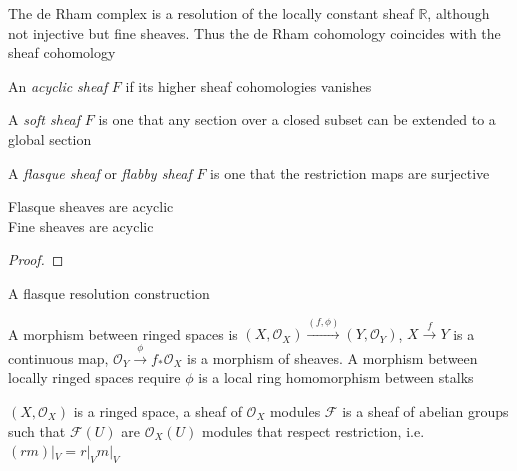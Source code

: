 \documentclass[main]{subfiles}
\begin{document}
\begin{example}
The de Rham complex is a resolution of the locally constant sheaf $\mathbb R$, although not injective but fine sheaves. Thus the de Rham cohomology coincides with the sheaf cohomology
\end{example}

\begin{definition}
An \textit{acyclic sheaf} $F$ if its higher sheaf cohomologies vanishes
\end{definition}

\begin{definition}
A \textit{soft sheaf} $F$ is one that any section over a closed subset can be extended to a global section
\end{definition}

\begin{definition}
A \textit{flasque sheaf} or \textit{flabby sheaf} $F$ is one that the restriction maps are surjective
\end{definition}

\begin{lemma}
Flasque sheaves are acyclic \\
Fine sheaves are acyclic
\end{lemma}

\begin{proof}

\end{proof}

\begin{definition}
A flasque resolution construction
\end{definition}

\begin{definition}
A morphism between ringed spaces is $(X,\mathcal O_X)\xrightarrow{(f,\phi)}(Y,\mathcal O_Y)$, $X\xrightarrow{f}Y$ is a continuous map, $\mathcal O_Y\xrightarrow{\phi}f_*\mathcal O_X$ is a morphism of sheaves. A morphism between locally ringed spaces require $\phi$ is a local ring homomorphism between stalks
\end{definition}

\begin{definition}
$(X,\mathcal O_X)$ is a ringed space, a sheaf of $\mathcal O_X$ modules $\mathcal F$ is a sheaf of abelian groups such that $\mathcal F(U)$ are $\mathcal O_X(U)$ modules that respect restriction, i.e. $(rm)|_V=r|_Vm|_V$
\end{definition}
\end{document}
